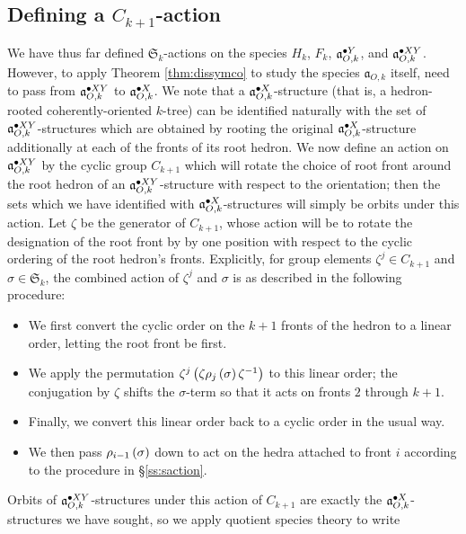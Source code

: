 \documentclass[sectionflow,singlespace,twoside,boldmathhdr]{brandiss} %
\numberwithin{section}{chapter}
\numberwithin{figure}{chapter}
\begin{document}
\subsection{Defining a $C_{k+1}$-action}\label{ss:zaction}
We have thus far defined $\mathfrak{S}_{k}$-actions on the species $H_{k}$, $F_{k}$, $\pointed[Y]{\mathfrak{a}}_{O, k}$, and $\pointed[XY]{\mathfrak{a}}_{O, k}$.
However, to apply Theorem \ref{thm:dissymco} to study the species $\mathfrak{a}_{O, k}$ itself, need to pass from $\pointed[XY]{\mathfrak{a}}_{O, k}$ to $\pointed[X]{\mathfrak{a}}_{O, k}$.
We note that a $\pointed[X]{\mathfrak{a}}_{O, k}$-structure (that is, a hedron-rooted coherently-oriented $k$-tree) can be identified naturally with the set of $\pointed[XY]{\mathfrak{a}}_{O, k}$-structures which are obtained by rooting the original $\pointed[X]{\mathfrak{a}}_{O, k}$-structure additionally at each of the fronts of its root hedron.
We now define an action on $\pointed[XY]{\mathfrak{a}}_{O, k}$ by the cyclic group $C_{k+1}$ which will rotate the choice of root front around the root hedron of an $\pointed[XY]{\mathfrak{a}}_{O, k}$-structure with respect to the orientation; then the sets which we have identified with $\pointed[X]{\mathfrak{a}}_{O, k}$-structures will simply be orbits under this action.
Let $\zeta$ be the generator of $C_{k+1}$, whose action will be to rotate the designation of the root front by by one position with respect to the cyclic ordering of the root hedron's fronts.
Explicitly, for group elements $\zeta^{j} \in C_{k+1}$ and $\sigma \in \mathfrak{S}_{k}$, the combined action of $\zeta^{j}$ and $\sigma$ is as described in the following procedure:
\begin{itemize}
\item We first convert the cyclic order on the $k+1$ fronts of the hedron to a linear order, letting the root front be first.
\item We apply the permutation $\zeta^{j} \pbrac{\zeta \rho_{j} \pbrac{\sigma} \zeta^{-1}}$ to this linear order; the conjugation by $\zeta$ shifts the $\sigma$-term so that it acts on fronts $2$ through $k+1$.
\item Finally, we convert this linear order back to a cyclic order in the usual way.  
\item We then pass $\rho_{i - 1} \pbrac{\sigma}$ down to act on the hedra attached to front $i$ according to the procedure in \S \ref{ss:saction}.
\end{itemize}
Orbits of $\pointed[XY]{\mathfrak{a}}_{O, k}$-structures under this action of $C_{k+1}$ are exactly the $\pointed[X]{\mathfrak{a}}_{O, k}$-structures we have sought, so we apply quotient species theory to write
\end{document}
